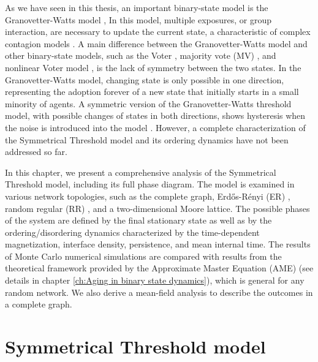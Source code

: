 As we have seen in this thesis, an important binary-state model is the Granovetter-Watts model \cite{granovetter-1978, watts-2002}, In this model, multiple exposures, or group interaction, are necessary to update the current state, a characteristic of complex contagion models \cite{centola-2007,unknown-author-2018}. A main difference between the Granovetter-Watts model and other binary-state models, such as the Voter \cite{Voter-original}, majority vote (MV) \cite{de1992isotropic,pereira2005majority,campos2003small}, and nonlinear Voter model \cite{castellano-2009,mobilia2015nonlinear,mellor2016characterization,Min-2017,jewski-2017,peralta-2018}, is the lack of symmetry between the two states. In the Granovetter-Watts model, changing state is only possible in one direction, representing the adoption forever of a new state that initially starts in a small minority of agents. A symmetric version of the Granovetter-Watts threshold model, with possible changes of states in both directions, shows hysteresis when the noise is introduced into the model \cite{nowak2019homogeneous,nowak2020symmetrical}. However, a complete characterization of the Symmetrical Threshold model and its ordering dynamics have not been addressed so far.

In this chapter, we present a comprehensive analysis of the Symmetrical Threshold model, including its full phase diagram. The model is examined in various network topologies, such as the complete graph, Erd\H{o}s-Rényi (ER)  \cite{erdos1960evolution}, random regular (RR) \cite{wormald_1999}, and a two-dimensional Moore lattice. The possible phases of the system are defined by the final stationary state as well as by the ordering/disordering dynamics characterized by the time-dependent magnetization, interface density, persistence, and mean internal time. The results of Monte Carlo numerical simulations are compared with results from the theoretical framework provided by the Approximate Master Equation (AME) (see details in chapter \ref{ch:Aging in binary state dynamics}), which is general for any random network. We also derive a mean-field analysis to describe the outcomes in a complete graph.

\section{\label{Symmetrical Threshold model} Symmetrical Threshold model}

